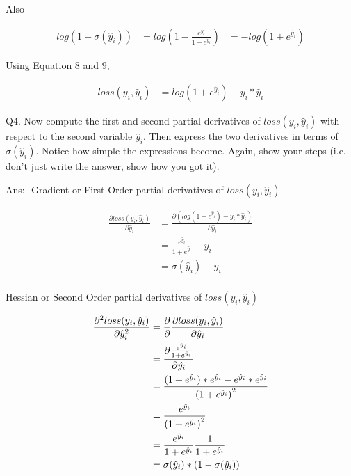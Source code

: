 \documentclass{article}
\begin{document}
\begin{flushleft}
Also 

\begin{equation}
\begin{aligned}
log(1-\sigma(\hat{y}_i)) &= log(1-\frac{e^{\hat{y}_i}}{1+e^{\hat{y}_i}})
&= -log({1+e^{\hat{y}_i}})
\end{aligned}
\end{equation}

Using Equation 8 and 9,

\begin{equation}
\begin{aligned}
loss(y_i, \hat{y}_i) &= log({1+e^{\hat{y}_i}}) - y_i*\hat{y}_i
\end{aligned}                    
\end{equation}

Q4. Now compute the first and second partial derivatives of $loss(y_i, \hat{y}_i)$ with respect to the second variable $\hat{y}_i$. Then express the two derivatives in terms of $\sigma(\hat{y}_i)$. Notice how simple the expressions become. Again, show your steps (i.e. don’t just write the answer, show how you got it).

Ans:- Gradient or First Order partial derivatives of $loss(y_i, \hat{y}_i)$

\begin{equation}
\begin{aligned}
\frac{\partial loss(y_i, \hat{y}_i)}{\partial \hat{y}_i} &=
\frac{\partial (log({1+e^{\hat{y}_i}}) - y_i*\hat{y}_i)} {\partial \hat{y}_i}
\\
&= \frac{{e^{\hat{y}_i}}}{{1+e^{\hat{y}_i}}} - y_i \\
&= \sigma(\hat{y}_i) - y_i \\
\end{aligned}
\end{equation}

Hessian or Second Order partial derivatives of $loss(y_i, \hat{y}_i)$

\begin{equation}
\begin{aligned}
\pdv[2]{loss(y_i, \hat{y}_i)}{\hat{y}_i} 
&= \frac{\partial}{\partial}\frac{\partial loss(y_i, \hat{y}_i)}{\partial \hat{y}_i} 
\\
&= \frac{\partial \frac{{e^{\hat{y}_i}}}{{1+e^{\hat{y}_i}}}}{\partial \hat{y_i}}  
\\
&= \frac{{({1+e^{\hat{y}_i}})*e^{\hat{y}_i} - e^{\hat{y}_i}*e^{\hat{y}_i}}}{{(1+e^{\hat{y}_i})}^2} 
\\
&= \frac{{e^{\hat{y}_i}}}{{(1+e^{\hat{y}_i})}^2}
\\
&= \frac{{e^{\hat{y}_i}}}{{1+e^{\hat{y}_i}}}\frac{1}{{1+e^{\hat{y}_i}}}
\\
&= \sigma(\hat{y}_i)*(1-\sigma(\hat{y}_i))
\end{aligned}
\end{equation}


\end{flushleft}
\end{document}
